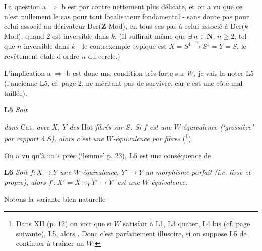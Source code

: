 La question a $\Longrightarrow$ b est par contre nettement plus délicate, et on a vu que ce n'est nullement le cas pour tout localisateur fondamental - sans doute pas pour celui associé au dérivateur Der($\mathbf{Z}$-Mod), en tous cas pas à celui associé à Der($k$-Mod), quand 2 est inversible dans $k$. (Il suffirait même que $\exists\ n \in \mathbf{N}$, $n \geq 2$, tel que $n$ inversible dans $k$ - le contrexemple typique est $X = S^1 \xrightarrow{\ n\ } S^1 = Y = S$, le revêtement étale d'ordre $n$ du cercle.)

L'implication a $\Longrightarrow$ b est donc une condition très forte sur $W$, je vais la noter L5 (l'ancienne L5, cf. page 2, ne méritant pas de survivre, car c'est une côte mal taillée).

\textbf{L5} \textit{Soit}  \textit{dans} Cat\textit{, avec $X$, $Y$ des} Hot-\textit{fibrés sur $S$. Si $f$ est une $W$-équivalence (‘grossière’ par rapport à $S$), alors c'est une $W$-équivalence par fibres} (\footnote[28]{Dans XII (p. 12) on voit que si $W$ satisfait à L1, L3 quater, L4 bis (cf. page suivante), L5, alors . Donc c'est parfaitement illusoire, si on suppose L5 de continuer à traîner un $W$.}).

On a vu qu'à un $\varepsilon$ près (‘lemme’ p. 23), L5 est une conséquence de

\textbf{L6} \textit{Soit $f : X \longrightarrow Y$ une $W$-équivalence, $Y' \longrightarrow Y$ un morphisme parfait (i.e. lisse et propre), alors $f' : X' = X \times_Y Y' \longrightarrow Y'$ est une $W$-équivalence.}

Notons la variante bien naturelle

